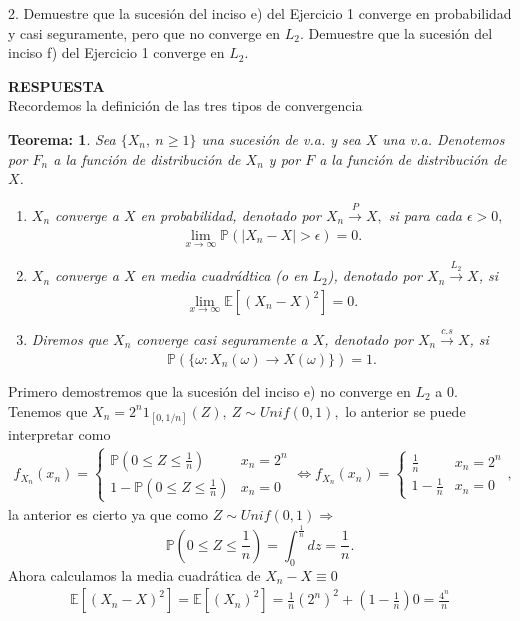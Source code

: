 \documentclass[11pt,letterpaper]{article}
\newcommand{\mP}{\mathbb{P}}
\newcommand{\mE}{\mathbb{E}}
\newcommand{\res}{\textbf{RESPUESTA}\\}
\newtheorem{thmt}{Teorema:}
\begin{document}
2. Demuestre que la sucesión del inciso e) del Ejercicio 1 converge en probabilidad y casi seguramente, pero que no converge en $L_2$. Demuestre que la sucesión del inciso f) del Ejercicio 1 converge en $L_2$.

\res Recordemos la definición de las tres tipos de convergencia 
\begin{framed}
    \begin{thmt} \label{convergencias}
	Sea $\{X_n,\ n\geq 1 \}$ una sucesión de v.a. y sea $X$ una v.a. Denotemos por $F_n$ a la función de distribución de $X_n$ y por $F$ a la función de distribución de $X$.

	\begin{enumerate}
	\item $X_n$ converge a $X$ en probabilidad, denotado por $X_n\xrightarrow[]{P} X,$ si para cada $\epsilon>0,$
	$$\lim_{x\rightarrow \infty} \mP(|X_n-X|>\epsilon)=0.$$
		
	\item $X_n$ converge a $X$ en media cuadrádtica (o en $L_2$), denotado por $X_n\xrightarrow[]{L_2} X$, si
	$$\lim_{x\rightarrow \infty} \mE[(X_n-X)^2]=0.$$
	
	\item Diremos que $X_n$ converge casi seguramente a $X$, denotado por $X_n\xrightarrow[]{c.s} X$, si 
	$$\mP(\{\omega: X_n(\omega) \rightarrow X(\omega)\})=1.$$
	\end{enumerate}
    \end{thmt}
\end{framed}
Primero demostremos que la sucesión del inciso e) no converge en $L_2$ a 0. Tenemos que $X_n=2^n 1_{[0,1/n]}(Z),\ Z\sim Unif(0,1),$ lo anterior se puede interpretar como
\begin{align*}
f_{X_n}(x_n)= \left\{\begin{array}{cc}
\mP\left(0 \leq Z \leq \frac{1}{n}\right) & x_n=2^n\\
1-\mP\left(0 \leq Z \leq \frac{1}{n}\right)& x_n=0
\end{array} \right. \Leftrightarrow f_{X_n}(x_n)= \left\{\begin{array}{cc}
\frac{1}{n} & x_n=2^n\\
1-\frac{1}{n} & x_n=0
\end{array} \right.,
\end{align*}
la anterior es cierto ya que como $Z\sim Unif(0,1)\Rightarrow $
$$\mP\left(0 \leq Z \leq \frac{1}{n}\right)=\int_0^\frac{1}{n} dz=\frac{1}{n}.$$
 Ahora calculamos la media cuadrática de $X_n-X\equiv 0$
\begin{align*}
\mE[\left(X_n-X \right)^2]=\mE[\left(X_n \right)^2]=\frac{1}{n}(2^n)^2+ \left(1-\frac{1}{n}\right)0=\frac{4^n}{n}
\end{align*}
\end{document}
